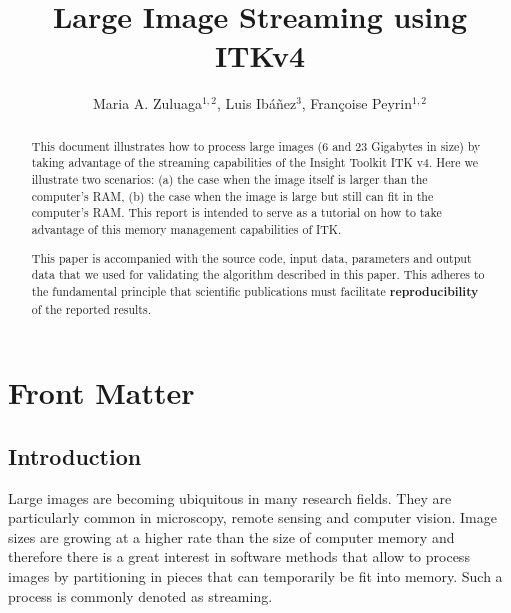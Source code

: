 \documentclass{InsightArticle}
\title{Large Image Streaming using ITKv4}
\author{Maria A. Zuluaga$^{1,2}$, Luis Ib\'{a}\~{n}ez$^{3}$, Fran\c{c}oise Peyrin$^{1,2}$}
\newcommand{\IJhandlerIDnumber}{3263}
\begin{document}
%
%
\IJhandlefooter{\IJhandlerIDnumber}


\ifpdf
\else
\fi


\maketitle


\ifhtml
\chapter*{Front Matter\label{front}}
\fi


\begin{abstract}
\noindent
This document illustrates how to process large images (6 and 23 Gigabytes in
size) by taking advantage of the streaming capabilities of the Insight Toolkit
ITK v4.  Here we illustrate two scenarios: (a) the case when the image itself is
larger than the computer's RAM, (b) the case when the image is large but still
can fit in the computer's RAM. This report is intended to serve as a tutorial
on how to take advantage of this memory management capabilities of ITK.

This paper is accompanied with the source code, input data, parameters and
output data that we used for validating the algorithm described in this paper.
This adheres to the fundamental principle that scientific publications must
facilitate \textbf{reproducibility} of the reported results.
\end{abstract}

\tableofcontents

\section{Introduction}

Large images are becoming ubiquitous in many research fields. They are
particularly common in microscopy, remote sensing and computer vision.  Image
sizes are growing at a higher rate than the size of computer memory and
therefore there is a great interest in software methods that allow to process
images by partitioning in pieces that can temporarily be fit into memory. Such a
process is commonly denoted as streaming.
\end{document}
